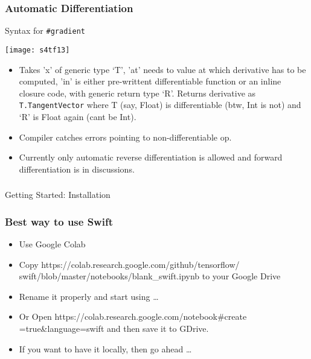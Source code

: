 \begin{frame}[fragile] \frametitle{Automatic Differentiation}

Syntax for \lstinline|#gradient|

\begin{center}
\texttt{[image: s4tf13]}
\end{center}


\begin{itemize}
\item Takes 'x' of generic type `T', 'at' needs to value at which derivative has to be computed, 'in' is either pre-writtent differentiable function or an inline closure code, with generic return type `R'. Returns derivative as \lstinline|T.TangentVector| where T (say, Float) is differentiable (btw, Int is not) and `R' is Float again (cant be Int).
\item Compiler catches errors pointing to non-differentiable op.
\item Currently only automatic reverse differentiation is allowed and forward differentiation is in discussions.
\end{itemize}


\end{frame}


\begin{frame}[fragile]\frametitle{}
\begin{center}
{\Large Getting Started: Installation}
\end{center}
\end{frame}

\begin{frame} \frametitle{Best way to use Swift}

\begin{itemize}
\item Use Google Colab
\item Copy https://colab.research.google.com/github/tensorflow/ swift/blob/master/notebooks/blank\_swift.ipynb to your Google Drive
\item Rename it properly and start using \ldots
\item Or Open https://colab.research.google.com/notebook\#create =true\&language=swift and then save it to GDrive.
\item If you want to have it locally, then go ahead \ldots
\end{itemize}

\end{frame}


